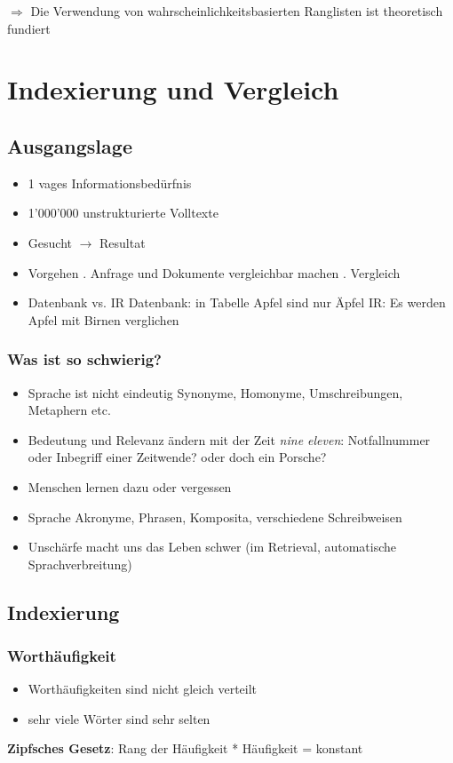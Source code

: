\documentclass{report}
\theoremstyle{definition}
\theoremstyle{example}
\begin{document}
$\Rightarrow$ Die Verwendung von wahrscheinlichkeitsbasierten Ranglisten ist theoretisch fundiert

\chapter{Indexierung und Vergleich}
\section{Ausgangslage}
\begin{itemize}
   \item 1 vages Informationsbedürfnis
   \item 1'000'000 unstrukturierte Volltexte
   \item Gesucht $\rightarrow$ Resultat
   \item Vorgehen
   . Anfrage und Dokumente vergleichbar machen
   . Vergleich
   \item Datenbank vs. IR
   \subitem Datenbank: in Tabelle Apfel sind nur Äpfel
   \subitem IR: Es werden Apfel mit Birnen verglichen
\end{itemize}

\subsection{Was ist so schwierig?}
\begin{itemize}
   \item Sprache ist nicht eindeutig
   \subitem Synonyme, Homonyme, Umschreibungen, Metaphern etc.
   \item Bedeutung und Relevanz ändern mit der Zeit
   \subitem \textit{nine eleven}: Notfallnummer oder Inbegriff einer Zeitwende? oder doch ein Porsche?
   \item Menschen lernen dazu oder vergessen
   \item Sprache Akronyme, Phrasen, Komposita, verschiedene Schreibweisen
   \item Unschärfe macht uns das Leben schwer (im Retrieval, automatische Sprachverbreitung)
\end{itemize}



\section{Indexierung}

\subsection{Worthäufigkeit}
\begin{itemize}
   \item Worthäufigkeiten sind nicht gleich verteilt
   \item sehr viele Wörter sind sehr selten
\end{itemize}
\textbf{Zipfsches Gesetz}: Rang der Häufigkeit * Häufigkeit = konstant
\end{document}
